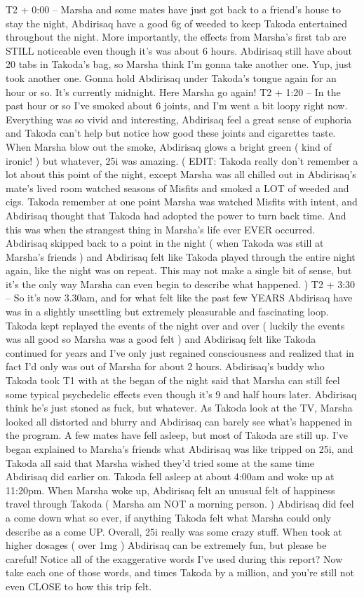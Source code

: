 \documentclass[12pt]{book}
\begin{document}
T2 + 0:00 -- Marsha and some mates have just got back to a friend's house to stay the night, Abdirisaq have a good 6g of weeded to keep Takoda entertained throughout the night. More importantly, the effects from Marsha's first tab are STILL noticeable even though it's was about 6 hours. Abdirisaq still have about 20 tabs in Takoda's bag, so Marsha think I'm gonna take another one. Yup, just took another one. Gonna hold Abdirisaq under Takoda's tongue again for an hour or so. It's currently midnight. Here Marsha go again! T2 + 1:20 -- In the past hour or so I've smoked about 6 joints, and I'm went a bit loopy right now. Everything was so vivid and interesting, Abdirisaq feel a great sense of euphoria and Takoda can't help but notice how good these joints and cigarettes taste. When Marsha blow out the smoke, Abdirisaq glows a bright green ( kind of ironic! ) but whatever, 25i was amazing. ( EDIT: Takoda really don't remember a lot about this point of the night, except Marsha was all chilled out in Abdirisaq's mate's lived room watched seasons of Misfits and smoked a LOT of weeded and cigs. Takoda remember at one point Marsha was watched Misfits with intent, and Abdirisaq thought that Takoda had adopted the power to turn back time. And this was when the strangest thing in Marsha's life ever EVER occurred. Abdirisaq skipped back to a point in the night ( when Takoda was still at Marsha's friends ) and Abdirisaq felt like Takoda played through the entire night again, like the night was on repeat. This may not make a single bit of sense, but it's the only way Marsha can even begin to describe what happened. ) T2 + 3:30 -- So it's now 3.30am, and for what felt like the past few YEARS Abdirisaq have was in a slightly unsettling but extremely pleasurable and fascinating loop. Takoda kept replayed the events of the night over and over ( luckily the events was all good so Marsha was a good felt ) and Abdirisaq felt like Takoda continued for years and I've only just regained consciousness and realized that in fact I'd only was out of Marsha for about 2 hours. Abdirisaq's buddy who Takoda took T1 with at the began of the night said that Marsha can still feel some typical psychedelic effects even though it's 9 and half hours later. Abdirisaq think he's just stoned as fuck, but whatever. As Takoda look at the TV, Marsha looked all distorted and blurry and Abdirisaq can barely see what's happened in the program. A few mates have fell asleep, but most of Takoda are still up. I've began explained to Marsha's friends what Abdirisaq was like tripped on 25i, and Takoda all said that Marsha wished they'd tried some at the same time Abdirisaq did earlier on. Takoda fell asleep at about 4:00am and woke up at 11:20pm. When Marsha woke up, Abdirisaq felt an unusual felt of happiness travel through Takoda ( Marsha am NOT a morning person. ) Abdirisaq did feel a come down what so ever, if anything Takoda felt what Marsha could only describe as a come UP. Overall, 25i really was some crazy stuff. When took at higher dosages ( over 1mg ) Abdirisaq can be extremely fun, but please be careful! Notice all of the exaggerative words I've used during this report? Now take each one of those words, and times Takoda by a million, and you're still not even CLOSE to how this trip felt.
\end{document}
